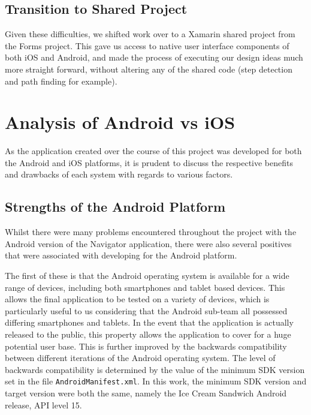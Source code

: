 \documentclass[12pt,a4paper]{report}
\begin{document}
\subsection{Transition to Shared Project}

Given these difficulties, we shifted work over to a Xamarin shared project from the Forms project. This gave us access to native user interface components of both iOS and Android, and made the process of executing our design ideas much more straight forward, without altering any of the shared code (step detection and path finding for example).

\section{Analysis of Android vs iOS}
As the application created over the course of this project was developed for both the Android and iOS platforms, it is prudent to discuss the respective benefits and drawbacks of each system with regards to various factors.

\subsection{Strengths of the Android Platform}
Whilst there were many problems encountered throughout the project with the Android version of the Navigator application, there were also several positives that were associated with developing for the Android platform.
            
The first of these is that the Android operating system is available for a wide range of devices, including both smartphones and tablet based devices. This allows the final application to be tested on a variety of devices, which is particularly useful to us considering that the Android sub-team all possessed differing smartphones and tablets. In the event that the application is actually released to the public, this property allows the application to cover for a huge potential user base. This is further improved by the backwards compatibility between different iterations of the Android operating system. The level of backwards compatibility is determined by the value of the minimum SDK version set in the file \texttt{AndroidManifest.xml}. In this work, the minimum SDK version and target version were both the same, namely the Ice Cream Sandwich Android release, API level 15.
            
\end{document}
